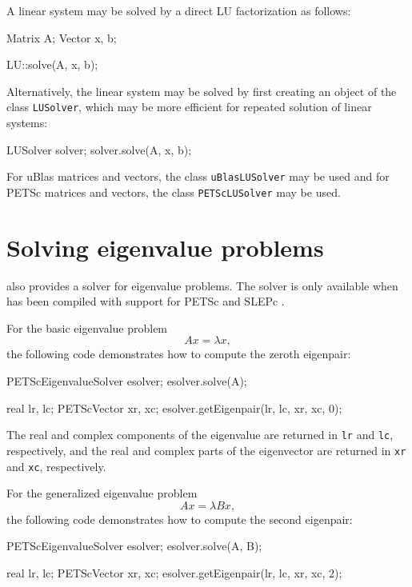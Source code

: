 A linear system may be solved by a direct LU factorization as follows:
\begin{code}
  Matrix A;
  Vector x, b;
  
  LU::solve(A, x, b);
\end{code}
Alternatively, the linear system may be solved by first creating an
object of the class \texttt{LUSolver}, which may be more efficient for
repeated solution of linear systems:
\begin{code}
  LUSolver solver;
  solver.solve(A, x, b);
\end{code}

For uBlas matrices and vectors, the class \texttt{uBlasLUSolver} may
be used and for PETSc matrices and vectors, the class
\texttt{PETScLUSolver} may be used.

\section{Solving eigenvalue problems}

\dolfin{} also provides a solver for eigenvalue
problems. The solver is only available when
\dolfin{} has been compiled with support for PETSc and SLEPc \cite{www:slepc}.

For the basic eigenvalue problem
\begin{equation}
  Ax = \lambda x,
\end{equation}
the following code demonstrates how to compute the zeroth eigenpair:
\begin{code} 
  PETScEigenvalueSolver esolver; 
  esolver.solve(A);

  real lr, lc;
  PETScVector xr, xc;
  esolver.getEigenpair(lr, lc, xr, xc, 0);
\end{code} 
The real and complex components of the eigenvalue are returned in \texttt{lr}
and \texttt{lc}, respectively, and the real and complex parts of the eigenvector
are returned in \texttt{xr} and \texttt{xc}, respectively.

For the generalized eigenvalue problem
\begin{equation}
  A x = \lambda B x,
\end{equation}
the following code demonstrates how to compute the second eigenpair:
\begin{code} 
  PETScEigenvalueSolver esolver; 
  esolver.solve(A, B);

  real lr, lc;
  PETScVector xr, xc;
  esolver.getEigenpair(lr, lc, xr, xc, 2);
\end{code} 

